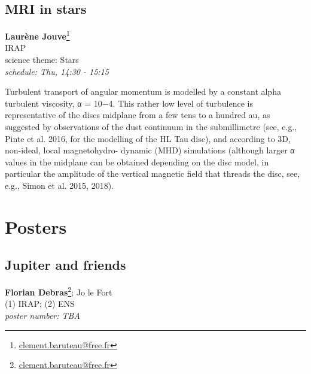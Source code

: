 \documentclass[11pt,twoside, openright]{report}
\begin{document}
        
          \section[Laurène Jouve: MRI in stars] { MRI in stars }
\textbf{ Laurène Jouve}\footnote{\href{mailto: clement.baruteau@free.fr}{clement.baruteau@free.fr} }\\
    IRAP\\


    
    \noindent
    science theme: Stars\\
    \emph{schedule: Thu, 14:30 - 15:15  }\\


 
    
\vspace{3 mm}

      Turbulent transport of angular momentum is modelled by a constant alpha turbulent viscosity, α = 10−4. This rather low level of turbulence is representative of the discs midplane from a few tens to a hundred au, as suggested by observations of the dust continuum in the submillimetre (see, e.g., Pinte et al. 2016, for the modelling of the HL Tau disc), and according to 3D, non-ideal, local magnetohydro- dynamic (MHD) simulations (although larger α values in the midplane can be obtained depending on the disc model, in particular the amplitude of the vertical magnetic field that threads the disc, see, e.g., Simon et al. 2015, 2018). 

        



\chapter{Posters}
        
          \section[Florian Debras: Jupiter and friends] { Jupiter and friends }
\textbf{ Florian Debras}\footnote{\href{mailto: clement.baruteau@free.fr}{clement.baruteau@free.fr} };  Jo le Fort\\
    (1) IRAP; (2)  ENS\\


    
    \emph{poster number: TBA }\\


 
    
\vspace{3 mm}
\end{document}
